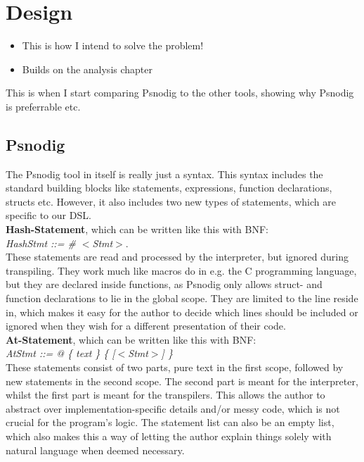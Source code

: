 \chapter{Design}
\begin{itemize}
    \item This is how I intend to solve the problem! %
    \item Builds on the analysis chapter
\end{itemize}

This is when I start comparing Psnodig to the other tools, showing why Psnodig is preferrable etc.

\section{Psnodig}

The Psnodig tool in itself is really just a syntax. This syntax includes the standard building blocks like statements, expressions, function declarations, structs etc. However, it also includes two new types of statements, which are specific to our DSL. \hfill \\

\textbf{Hash-Statement}, which can be written like this with BNF: \hfill \\

\textit{HashStmt ::= \# $<$Stmt$>$}. \hfill \\

These statements are read and processed by the interpreter, but ignored during transpiling. They work much like macros do in e.g. the C programming language, but they are declared inside functions, as Psnodig only allows struct- and function declarations to lie in the global scope. They are limited to the line reside in, which makes it easy for the author to decide which lines should be included or ignored when they wish for a different presentation of their code. \hfill \\

\textbf{At-Statement}, which can be written like this with BNF: \hfill \\

\textit{AtStmt ::= @ \{ text \} \{ [$<$Stmt$>$] \}} \hfill \\

These statements consist of two parts, pure text in the first scope, followed by new statements in the second scope. The second part is meant for the interpreter, whilst the first part is meant for the transpilers. This allows the author to abstract over implementation-specific details and/or messy code, which is not crucial for the program's logic. The statement list can also be an empty list, which also makes this a way of letting the author explain things solely with natural language when deemed necessary. \hfill \\

